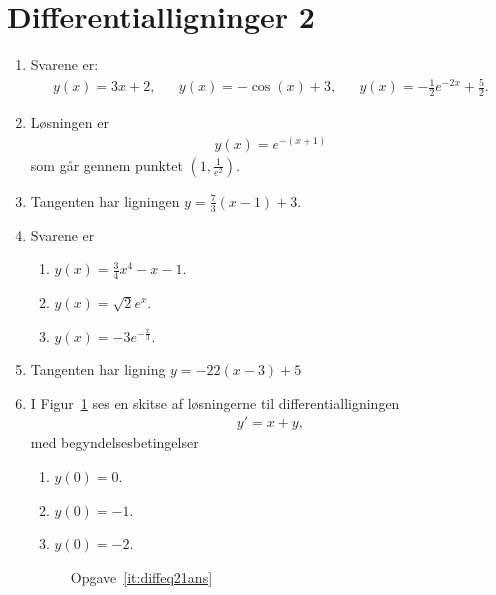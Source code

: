 \section{Differentialligninger 2}
\begin{enumerate}
	\item Svarene er:
	\begin{align*}
	y(x)=3x+2,&&y(x)=-\cos(x)+3,&&y(x)=-\frac{1}{2}e^{-2x}+\frac{5}{2}.
	\end{align*}
	
	\item Løsningen er
	\begin{align*}
	y(x)=e^{-(x+1)}
	\end{align*}
	som går gennem punktet $(1,\frac{1}{e^2})$. 
	
	\item Tangenten har ligningen $y=\frac{7}{3}(x-1)+3$.

	\item Svarene er
\begin{enumerate}
	\item $y(x)=\frac{3}{4}x^4-x-1$.
	\item $y(x)=\sqrt{2}e^{x}$.
	\item $y(x)=-3e^{-\frac{x}{3}}$.
\end{enumerate}	
	
		\item Tangenten har ligning $y=-22(x-3)+5$
		
		\item\label{it:diffeq21ans} I Figur~\ref{fig:diffeq21ans} ses en skitse af løsningerne til differentialligningen
	\begin{align*}
	y'=x+y,
	\end{align*}
	med begyndelsesbetingelser
	\begin{enumerate}
		\item $y(0)=0$.
		\item $y(0)=-1$.
		\item $y(0)=-2$.
	\end{enumerate}
	
	
	\begin{figure}
		\centering
		\caption{Opgave~\ref{it:diffeq21ans}}
		\label{fig:diffeq21ans}
	\end{figure}
	

\end{enumerate}
